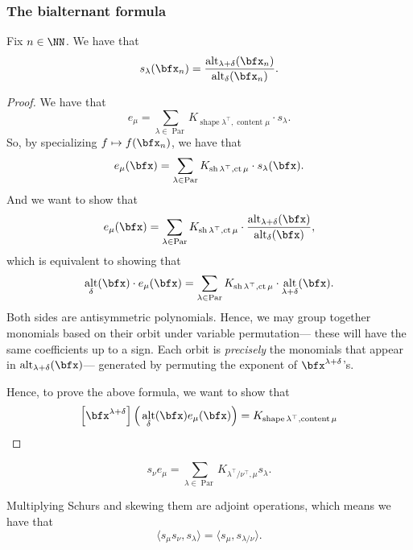 \documentclass{article}
\DeclareMathOperator{\shape}{shape}
\DeclareMathOperator{\sh}{sh}
\DeclareMathOperator{\content}{content}
\DeclareMathOperator{\ct}{ct}
\DeclareMathOperator{\Par}{Par}
\DeclareMathOperator{\alt}{alt}
\begin{document}
\subsubsection{The bialternant formula}

\begin{theorem}
    Fix $n \in \NN$.
    We have that
    \[
        s_\lambda(\bfx_n) 
        = 
        \frac{\alt_{\lambda + \delta}(\bfx_n)}{\alt_\delta(\bfx_n)}.
    \]
\end{theorem}

\begin{proof}
    We have that
    \[
        e_\mu = \sum_{\lambda \in \Par} K_{\shape\lambda^\top,\content\mu} \cdot s_\lambda.
    \]
    So, by specializing $f \mapsto f(\bfx_n)$, we have that
    \[
        e_\mu(\bfx) 
        = 
        \sum_{\lambda \in \Par} 
        K_{\sh\lambda^\top,\ct\mu} \cdot s_\lambda(\bfx).
    \]
    And we want to show that
    \[
        e_\mu(\bfx) 
        = 
        \sum_{\lambda \in \Par} 
        K_{\sh\lambda^\top,\ct\mu} 
        \cdot 
        \frac{\alt_{\lambda+\delta}(\bfx)}{\alt_\delta(\bfx)},
    \]
    which is equivalent to showing that
    \[
        \alt_\delta(\bfx) \cdot e_\mu(\bfx) 
        = 
        \sum_{\lambda \in \Par} K_{\sh\lambda^\top,\ct\mu} \cdot \alt_{\lambda+\delta}(\bfx).
    \]
    Both sides are antisymmetric polynomials.
    Hence, we may group together monomials based on their orbit under variable permutation--- these will have the same coefficients up to a sign.
    Each orbit is \textit{precisely} the monomials that appear in $\alt_{\lambda+\delta}(\bfx)$--- generated by permuting the exponent of $\bfx^{\lambda+\delta}$'s.

    Hence, to prove the above formula, we want to show that 
    \[
    \left[\bfx^{\lambda+\delta}\right] 
    \Big(
        \alt_\delta (\bfx) e_\mu(\bfx)
    \Big) 
    = 
    K_{\shape \lambda^\top, \content \mu}
    \]
\end{proof}

\begin{corollary}
    \[
        s_\nu e_\mu = \sum_{\lambda\in\Par}K_{\lambda^\top/\nu^\top,\mu} s_\lambda.
    \]
\end{corollary}


\begin{theorem}
    Multiplying Schurs and skewing them are adjoint operations, which means we have that
    \[
        \langle s_\mu s_\nu, s_\lambda \rangle
        =
        \langle s_\mu, s_{\lambda/\nu} \rangle.
    \]
\end{theorem}
\end{document}
